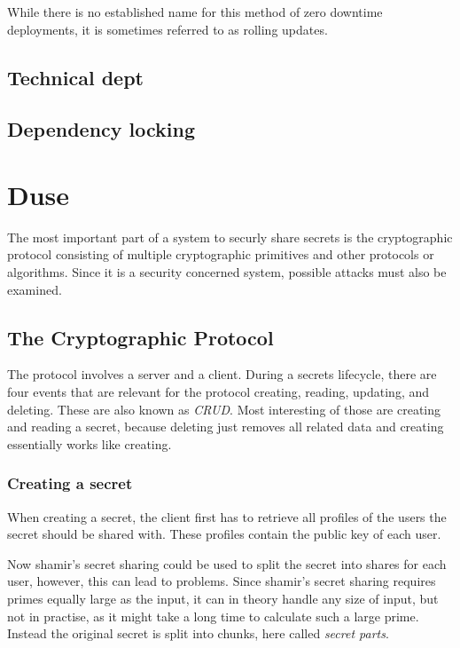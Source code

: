While there is no established name for this method of zero downtime
deployments, it is sometimes referred to as rolling updates.

\section{Technical dept}
\section{Dependency locking}

\chapter{Duse}

The most important part of a system to securly share secrets is the
cryptographic protocol consisting of multiple cryptographic primitives and
other protocols or algorithms. Since it is a security concerned system,
possible attacks must also be examined.

\section{The Cryptographic Protocol}

The protocol involves a server and a client. During a secrets lifecycle, there
are four events that are relevant for the protocol creating, reading, updating,
and deleting. These are also known as \textit{CRUD}. Most interesting of those
are creating and reading a secret, because deleting just removes all related
data and creating essentially works like creating.

\subsection{Creating a secret}

When creating a secret, the client first has to retrieve all profiles of the
users the secret should be shared with. These profiles contain the public key
of each user.

Now shamir's secret sharing could be used to split the secret into shares for
each user, however, this can lead to problems. Since shamir's secret sharing
requires primes equally large as the input, it can in theory handle any size of
input, but not in practise, as it might take a long time to calculate such a
large prime. Instead the original secret is split into chunks, here called
\textit{secret parts}.

